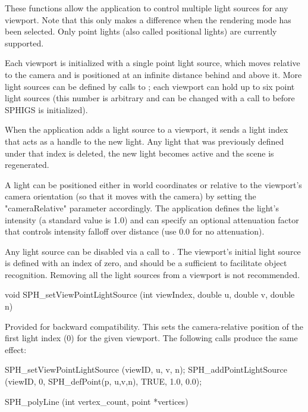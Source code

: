 \newpar
These functions allow the application to control multiple
light sources for any viewport.  Note that this only makes a
difference when the  rendering mode has been selected.  Only
point lights (also called positional lights) are currently supported.

\newpar
Each viewport is initialized with a single point light source,
which moves relative to the camera and is positioned at an infinite
distance behind and above it.  More light sources can be defined by
calls to ; each viewport can hold up to six
point light sources (this number is arbitrary and can be changed with
a call to  before SPHIGS is initialized).

\newpar
When the application adds a light source to a viewport, it
sends a light index that acts as a handle to the new light.  Any light
that was previously defined under that index is deleted, the new
light becomes active and the scene is regenerated.

\newpar
A light can be positioned either in world coordinates or
relative to the viewport's camera orientation (so that it moves with
the camera) by setting the "cameraRelative" parameter accordingly.
The application defines the light's intensity (a standard value is
1.0) and can specify an optional attenuation factor that controls
intensity falloff over distance (use 0.0 for no attenuation).

\newpar
Any light source can be disabled via a call to
.  The viewport's initial light source is
defined with an index of zero, and should be a sufficient to
facilitate object recognition.  Removing all the light sources from a
viewport is not recommended.
	
\begincode
void SPH_setViewPointLightSource (int viewIndex, double u, double v, double n)
\endcode

Provided for backward compatibility.  This sets the camera-relative
position of the first light index (0) for the given viewport.  The
following calls produce the same effect:

\begincode
	SPH_setViewPointLightSource (viewID, u, v, n);
	SPH_addPointLightSource (viewID, 0, SPH_defPoint(p, u,v,n), TRUE, 1.0, 0.0);
\endcode




\begincode
SPH_polyLine (int vertex_count, point *vertices) \elementgenerator
\endcode

